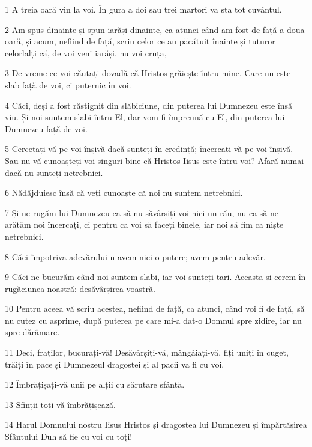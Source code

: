 \par 1 A treia oară vin la voi. În gura a doi sau trei martori va sta tot cuvântul.
\par 2 Am spus dinainte și spun iarăși dinainte, ca atunci când am fost de față a doua oară, și acum, nefiind de față, scriu celor ce au păcătuit înainte și tuturor celorlalți că, de voi veni iarăși, nu voi cruța,
\par 3 De vreme ce voi căutați dovadă că Hristos grăiește întru mine, Care nu este slab față de voi, ci puternic în voi.
\par 4 Căci, deși a fost răstignit din slăbiciune, din puterea lui Dumnezeu este însă viu. Și noi suntem slabi întru El, dar vom fi împreună cu El, din puterea lui Dumnezeu față de voi.
\par 5 Cercetați-vă pe voi înșivă dacă sunteți în credință; încercați-vă pe voi înșivă. Sau nu vă cunoașteți voi singuri bine că Hristos Iisus este întru voi? Afară numai dacă nu sunteți netrebnici.
\par 6 Nădăjduiesc însă că veți cunoaște că noi nu suntem netrebnici.
\par 7 Și ne rugăm lui Dumnezeu ca să nu săvârșiți voi nici un rău, nu ca să ne arătăm noi încercați, ci pentru ca voi să faceți binele, iar noi să fim ca niște netrebnici.
\par 8 Căci împotriva adevărului n-avem nici o putere; avem pentru adevăr.
\par 9 Căci ne bucurăm când noi suntem slabi, iar voi sunteți tari. Aceasta și cerem în rugăciunea noastră: desăvârșirea voastră.
\par 10 Pentru aceea vă scriu acestea, nefiind de față, ca atunci, când voi fi de față, să nu cutez cu asprime, după puterea pe care mi-a dat-o Domnul spre zidire, iar nu spre dărâmare.
\par 11 Deci, fraților, bucurați-vă! Desăvârșiți-vă, mângâiați-vă, fiți uniți în cuget, trăiți în pace și Dumnezeul dragostei și al păcii va fi cu voi.
\par 12 Îmbrățișați-vă unii pe alții cu sărutare sfântă.
\par 13 Sfinții toți vă îmbrățișează.
\par 14 Harul Domnului nostru Iisus Hristos și dragostea lui Dumnezeu și împărtășirea Sfântului Duh să fie cu voi cu toți!


